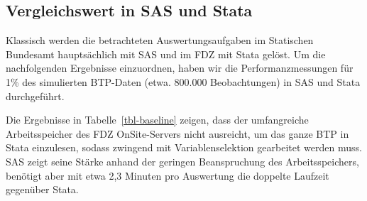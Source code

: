 \documentclass[
  german,
  10pt,
  twoside]{article}
\let\oldref\ref
\renewcommand{\ref}[1]{\oldref{#1}\raisebox{-0.2ex}{\scriptsize\color{wistaBlue}\ding{247}}}
\begin{document}
\subsection{Vergleichswert in SAS und
Stata}\label{vergleichswert-in-sas-und-stata}

Klassisch werden die betrachteten Auswertungsaufgaben im Statischen
Bundesamt hauptsächlich mit SAS und im FDZ mit Stata gelöst. Um die
nachfolgenden Ergebnisse einzuordnen, haben wir die Performanzmessungen
für 1\% des simulierten BTP-Daten (etwa. 800.000 Beobachtungen) in SAS
und Stata durchgeführt.

\begin{table}

\caption{\label{tbl-baseline}Baselines in SAS und Stata (anhand 1\% des simuliertes BTP)}


\end{table}%

Die Ergebnisse in Tabelle~\ref{tbl-baseline} zeigen, dass der
umfangreiche Arbeitsspeicher des FDZ OnSite-Servers nicht ausreicht, um
das ganze BTP in Stata einzulesen, sodass zwingend mit
Variablenselektion gearbeitet werden muss. SAS zeigt seine Stärke anhand
der geringen Beanspruchung des Arbeitsspeichers, benötigt aber mit etwa
2,3 Minuten pro Auswertung die doppelte Laufzeit gegenüber Stata.
\end{document}
